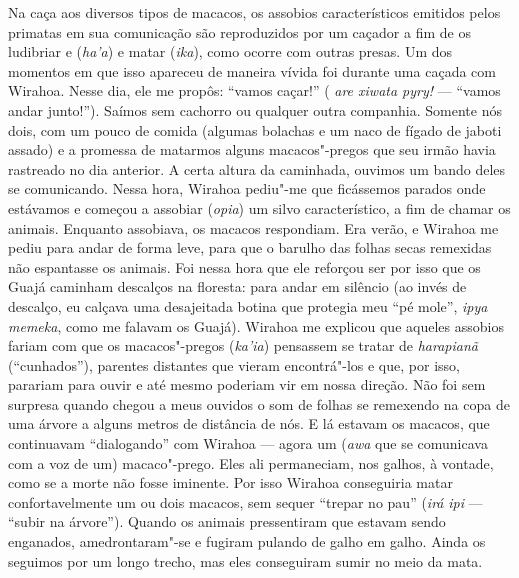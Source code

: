 Na caça aos diversos tipos de macacos, os assobios característicos
emitidos pelos primatas em sua comunicação são reproduzidos por um
caçador a fim de os ludibriar e (\emph{ha'a}) e matar (\emph{ika}), como
ocorre com outras presas. Um dos momentos em que isso apareceu de
maneira vívida foi durante uma caçada com Wirahoa. Nesse dia, ele me
propôs: ``vamos caçar!'' ( \emph{are xiwata pyry!} --- ``vamos andar
junto!''). Saímos sem cachorro ou qualquer outra companhia. Somente nós
dois, com um pouco de comida (algumas bolachas e um naco de fígado de
jaboti assado) e a promessa de matarmos alguns macacos"-pregos que seu
irmão havia rastreado no dia anterior. A certa altura da caminhada,
ouvimos um bando deles se comunicando. Nessa hora, Wirahoa pediu"-me que
ficássemos parados onde estávamos e começou a assobiar (\emph{opia}) um
silvo característico, a fim de chamar os animais. Enquanto assobiava, os
macacos respondiam. Era verão, e Wirahoa me pediu para andar de forma
leve, para que o barulho das folhas secas remexidas não espantasse os
animais. Foi nessa hora que ele reforçou ser por isso que os Guajá
caminham descalços na floresta: para andar em silêncio (ao invés de
descalço, eu calçava uma desajeitada botina que protegia meu ``pé mole'',
\emph{ipya} \emph{memeka}, como me falavam os Guajá). Wirahoa me
explicou que aqueles assobios fariam com que os macacos"-pregos
(\emph{ka'ia}) pensassem se tratar de \emph{harapianã} (``cunhados''),
parentes distantes que vieram encontrá"-los e que, por isso, parariam
para ouvir e até mesmo poderiam vir em nossa direção. Não foi sem
surpresa quando chegou a meus ouvidos o som de folhas se remexendo na
copa de uma árvore a alguns metros de distância de nós. E lá estavam os
macacos, que continuavam ``dialogando'' com Wirahoa --- agora um (\emph{awa}
que se comunicava com a voz de um) macaco"-prego. Eles ali permaneciam,
nos galhos, à vontade, como se a morte não fosse iminente. Por isso
Wirahoa conseguiria matar confortavelmente um ou dois macacos, sem
sequer ``trepar no pau'' (\emph{irá} \emph{ipi} --- ``subir na árvore'').
Quando os animais pressentiram que estavam sendo enganados,
amedrontaram"-se e fugiram pulando de galho em galho. Ainda os seguimos
por um longo trecho, mas eles conseguiram sumir no meio da mata.

